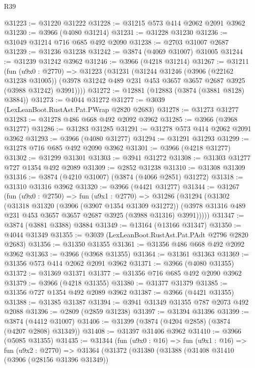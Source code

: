 \begin{lexlean}{R39}
\begin{coremodule}
@31223 := @31220 @31222
@31228 := @31215 @573 @414 @2062 @2091 @3962
@31230 := @3966 (@4080 @31214)
@31231 := @31228 @31230
@31236 := @31049 @31214 @716 @685 @492 @2090
@31238 := @2703 @31007 @2687
@31239 := @31236 @31238
@31242 := @3874 (@4069 @31007) @31005
@31244 := @31239 @31242 @3962
@31246 := @3966 (@4218 @31214)
@31267 := @31211
    (fun (u9x0 : @2770) =>
    @31223
      (@31231
        (@31244
          @31246
          (@3906 (@22162 @31238 @31005))
          (@3978 @31242 @489 @231 @453 @3657 @3657 @2687 @3925 (@3988 @31242) @3991))))
@31272 := @12881 (@12883 (@3874 (@3881 @8128) @3884))
@31273 := @4044 @31272
@31277 := @3039 (LexLeanBoot.RustAst.Pat.PWrap @2820 @2683)
@31278 := @31273 @31277
@31283 := @31278 @486 @668 @492 @2092 @3962
@31285 := @3966 (@3968 @31277)
@31286 := @31283 @31285
@31291 := @31278 @573 @414 @2062 @2091 @3962
@31293 := @3966 (@4080 @31277)
@31294 := @31291 @31293
@31299 := @31278 @716 @685 @492 @2090 @3962
@31301 := @3966 (@4218 @31277)
@31302 := @31299 @31301
@31303 := @3941 @31272
@31308 := @31303 @31277 @727 @1354 @492 @2089
@31309 := @2852 @31238
@31310 := @31308 @31309
@31316 := @3874 (@4210 @31007) (@3874 (@4066 @2851) @31272)
@31318 := @31310 @31316 @3962
@31320 := @3966 (@4421 @31277)
@31344 := @31267
    (fun (u9x0 : @2750) =>
    fun (u9x1 : @2770) =>
    @31286
      (@31294
        (@31302
          (@31318
            @31320
            (@3906 (@3907 @1354 @31309 @31272))
            (@3978 @31316 @489 @231 @453 @3657 @3657 @2687 @3925 (@3988 @31316) @3991)))))
@31347 := @3874 (@3881 @3388) @3884
@31349 := @13164 (@13166 @31347)
@31350 := @4044 @31349
@31355 := @3039 (LexLeanBoot.RustAst.Pat.PAdt @2796 @2820 @2683)
@31356 := @31350 @31355
@31361 := @31356 @486 @668 @492 @2092 @3962
@31363 := @3966 (@3968 @31355)
@31364 := @31361 @31363
@31369 := @31356 @573 @414 @2062 @2091 @3962
@31371 := @3966 (@4080 @31355)
@31372 := @31369 @31371
@31377 := @31356 @716 @685 @492 @2090 @3962
@31379 := @3966 (@4218 @31355)
@31380 := @31377 @31379
@31385 := @31356 @727 @1354 @492 @2089 @3962
@31387 := @3966 (@4421 @31355)
@31388 := @31385 @31387
@31394 := @3941 @31349 @31355 @787 @2073 @492 @2088
@31396 := @2809 (@2859 @31238)
@31397 := @31394 @31396
@31399 := @3874 (@4412 @31007)
@31406 := @31399 (@3874 (@4204 @2858) (@3874 (@4207 @2808) @31349))
@31408 := @31397 @31406 @3962
@31410 := @3966 (@5085 @31355)
@31435 := @31344
    (fun (u9x0 : @16) =>
    fun (u9x1 : @16) =>
    fun (u9x2 : @2770) =>
    @31364
      (@31372
        (@31380
          (@31388
            (@31408
              @31410
              (@3906 (@28156 @31396 @31349))

\end{coremodule}
\end{lexlean}
